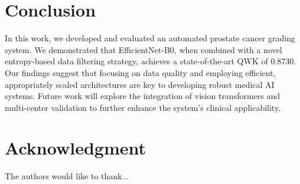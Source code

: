 \documentclass[10pt,conference]{IEEEtran}
\begin{document}
\section{Conclusion}
In this work, we developed and evaluated an automated prostate cancer grading system. We demonstrated that EfficientNet-B0, when combined with a novel entropy-based data filtering strategy, achieves a state-of-the-art QWK of 0.8730. Our findings suggest that focusing on data quality and employing efficient, appropriately scaled architectures are key to developing robust medical AI systems. Future work will explore the integration of vision transformers and multi-center validation to further enhance the system's clinical applicability.






\section*{Acknowledgment}


The authors would like to thank...









%
%





\end{document}
